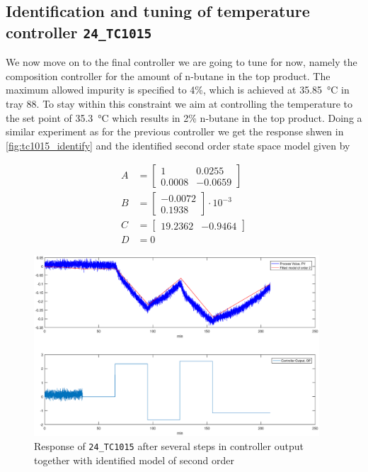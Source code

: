 \clearpage
\subsection{Identification and tuning of temperature controller \texttt{24\_TC1015}}
We now move on to the final controller we are going to tune for now, namely the composition controller for the amount of n-butane in the top product. The maximum allowed impurity is specified to 4\%, which is achieved at \SI{35.85}{\degreeCelsius} in tray 88. To stay within this constraint we aim at controlling the temperature to the set point of \SI{35.3}{\degreeCelsius} which results in 2\% n-butane in the top product. Doing a similar experiment as for the previous controller we get the response shwen in \autoref{fig:tc1015_identify} and the identified second order state space model given by

\begin{equation}
	\begin{aligned}
		A &= \begin{bmatrix}
			1 & 0.0255 \\ 0.0008 & -0.0659
		\end{bmatrix} \\
		B &= \begin{bmatrix}
			-0.0072 \\ 0.1938
		\end{bmatrix} \cdot 10^{-3}\\
		C &= \begin{bmatrix}
			19.2362 & -0.9464
		\end{bmatrix}\\
		D &= 0
	\end{aligned}
\end{equation}

\begin{figure}[ht!]
	\centering
	\includegraphics[width=0.95\textwidth]{fig/identification/tc1015_identify.eps}
	\caption{Response of \texttt{24\_TC1015} after several steps in controller output together with identified model of second order}
	\label{fig:tc1015_identify}
\end{figure}


